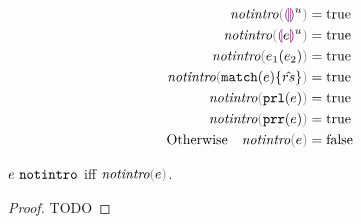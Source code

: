 \begin{subequations}\label{defn:notintro}
  \begin{align}
    \fnotIntro{\hehole{u}} ={}& \true \label{defn:ehole-notintro}\\
    \fnotIntro{\hhole{e}{u}} ={}& \true \label{defn:hole-notintro}\\
    \fnotIntro{\hap{e_1}{e_2}} ={}& \true \label{defn:ap-notintro}\\
    \fnotIntro{\hmatch{e}{\zrules}} ={}& \true \label{defn:match-notintro}\\
    \fnotIntro{\hprl{e}} ={}& \true \label{defn:prl-notintro}\\
    \fnotIntro{\hprr{e}} ={}& \true \label{defn:prr-notintro}\\
    \text{Otherwise}\quad \fnotIntro{e} ={}& \false \label{defn:not-notintro}
  \end{align}
\end{subequations}

\begin{lemma}
  \label{lem:sound-complete-notintro}
  $e ~\mathtt{notintro}$ iff $\fnotIntro{e}$.
\end{lemma}
\begin{proof}
  TODO
\end{proof}

